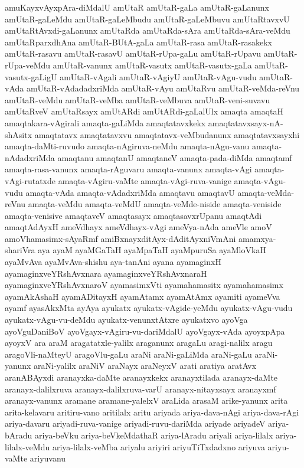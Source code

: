 {amuKayxvAyxpAra-diMdalU
amUtaR
amUtaR-gaLa
amUtaR-gaLanunx
amUtaR-gaLeMdu
amUtaR-gaLeMbudu
amUtaR-gaLeMbuvu
amUtaRtavxvU
amUtaRtAvxdi-gaLanunx
amUtaRda
amUtaRda-sAra
amUtaRda-sAra-veMdu
amUtaRparxdhAna
amUtaR-BUtA-gaLa
amUtaR-rasa
amUtaR-rasakekx
amUtaR-rasavu
amUtaR-rasavU
amUtaR-rUpa-gaLu
amUtaR-rUpavu
amUtaR-rUpa-veMdu
amUtaR-vanunx
amUtaR-vasutx
amUtaR-vasutx-gaLa
amUtaR-vasutx-gaLigU
amUtaR-vAgali
amUtaR-vAgiyU
amUtaR-vAgu-vudu
amUtaR-vAda
amUtaR-vAdadadxriMda
amUtaR-vAyu
amUtaRvu
amUtaR-veMda-reVnu
amUtaR-veMdu
amUtaR-veMba
amUtaR-veMbuva
amUtaR-veni-suvavu
amUtaRveV
amUtaRsayx
amUtARdi
amUtARdi-gaLalUlx
amaqta
amaqtaH
amaqtakara-vAgirali
amaqta-gaLiMda
amaqtatavxkekx
amaqtatavxsayx-nA-shAsitx
amaqtatavx
amaqtatavxvu
amaqtatavx-veMbudanunx
amaqtatavxsayxhi
amaqta-daMti-ruvudo
amaqta-nAgiruva-neMdu
amaqta-nAgu-vanu
amaqta-nAdadxriMda
amaqtanu
amaqtanU
amaqtaneV
amaqta-pada-diMda
amaqtamf
amaqta-rasa-vanunx
amaqta-rAguvaru
amaqta-vanunx
amaqta-vAgi
amaqta-vAgi-rutatxde
amaqta-vAgiru-vaMte
amaqta-vAgi-ruva-vanige
amaqta-vAgu-vudu
amaqta-vAda
amaqta-vAdadxriMda
amaqtavu
amaqtavU
amaqta-veMda-reVnu
amaqta-veMdu
amaqta-veMdU
amaqta-veMde-niside
amaqta-veniside
amaqta-venisive
amaqtaveV
amaqtasayx
amaqtasavxrUpanu
amaqtAdi
amaqtAdAyxH
ameVdhayx
ameVdhayx-vAgi
ameVya-nAda
ameVle
amoV
amoVhamasimx-sAyaRmf
amiBxnayxditAyx-dAditAyxniVmAni
amamxya-shariVra
aya
ayaM
ayaMGaTaH
ayaMpaTaH
ayaMpuruSa
ayaMloVkaH
ayaMvAva
ayaMvAva-shishu
aya-tanAni
ayana
ayamaginxH
ayamaginxveYRshAvxnara
ayamaginxveYRshAvxnaraH
ayamaginxveYRshAvxnaroV
ayamasimxVti
ayamahamasitx
ayamahamasimx
ayamAkAshaH
ayamADitayxH
ayamAtamx
ayamAtAmx
ayamiti
ayameVva
ayamf
ayasAkxMta
ayAya
ayukatx
ayukatx-vAgide-yeMdu
ayukatx-vAgu-vudu
ayukatx-vAgu-vu-deMdu
ayukatx-venunxtAtxre
ayukatxvo
ayoVga
ayoVguDaniBoV
ayoVgayx-vAgiru-vu-dariMdalU
ayoVgayx-vAda
ayoyxpApa
ayoyxV
ara
araM
aragatatxle-yalilx
araganunx
aragaLu
aragi-nalilx
aragu
aragoVli-naMteyU
aragoVlu-gaLu
araNi
araNi-gaLiMda
araNi-gaLu
araNi-yanunx
araNi-yalilx
araNiV
araNayx
araNeyxV
arati
aratiya
aratAvx
aranABAyxdi
aranayxka-daMte
aranayxkekx
aranayxtilada
aranayx-daMte
aranayx-dalilxruva
aranayx-dalilxruva-varU
aranayx-nitayxsayx
aranayxmf
aranayx-vanunx
aramane
aramane-yalelxV
araLida
arasaM
arike-yanunx
arita
arita-kelavaru
aritiru-vano
aritilalx
aritu
ariyada
ariya-dava-nAgi
ariya-dava-rAgi
ariya-davaru
ariyadi-ruva-vanige
ariyadi-ruvu-dariMda
ariyade
ariyadeV
ariya-bAradu
ariya-beVku
ariya-beVkeMdathaR
ariya-lAradu
ariyali
ariya-lilalx
ariya-lilalx-veMdu
ariya-lilalx-veMba
ariyalu
ariyiri
ariyuTiTxdadxno
ariyuva
ariyu-vaMte
ariyuvanu
}
